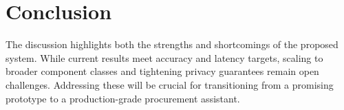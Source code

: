 \section{Conclusion}
The discussion highlights both the strengths and shortcomings of the proposed system.  While current results meet accuracy and latency targets, scaling to broader component classes and tightening privacy guarantees remain open challenges.  Addressing these will be crucial for transitioning from a promising prototype to a production-grade procurement assistant.